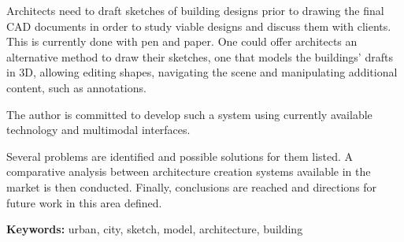Architects need to draft sketches of building designs prior to drawing
the final CAD documents in order to study viable designs and discuss them with clients.
This is currently done with pen and paper. One could offer architects an alternative
method to draw their sketches, one that models the buildings' drafts in 3D, allowing
editing shapes, navigating the scene and manipulating additional content,
such as annotations.

The author is committed to develop such a system using currently available technology
and multimodal interfaces.

Several problems are identified and possible solutions for them listed.
A comparative analysis between architecture creation systems available in the market
is then conducted.
Finally, conclusions are reached and directions for future work in this area defined.

\textbf{Keywords:} urban, city, sketch, model, architecture, building

